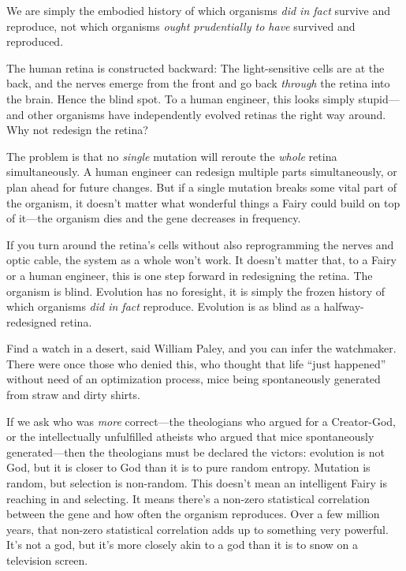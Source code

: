 {
 We are simply the embodied history of which organisms \textit{did
in fact} survive and reproduce, not which organisms \textit{ought
prudentially to have} survived and reproduced.}

{
 The human retina is constructed backward: The light-sensitive
cells are at the back, and the nerves emerge from the front and go back
\textit{through} the retina into the brain. Hence the blind spot. To a
human engineer, this looks simply stupid---and other organisms have
independently evolved retinas the right way around. Why not redesign
the retina?}

{
 The problem is that no \textit{single} mutation will reroute the
\textit{whole} retina simultaneously. A human engineer can redesign
multiple parts simultaneously, or plan ahead for future changes. But if
a single mutation breaks some vital part of the organism, it
doesn't matter what wonderful things a Fairy could
build on top of it---the organism dies and the gene decreases in
frequency.}

{
 If you turn around the retina's cells without also
reprogramming the nerves and optic cable, the system as a whole
won't work. It doesn't matter that, to
a Fairy or a human engineer, this is one step forward in redesigning
the retina. The organism is blind. Evolution has no foresight, it is
simply the frozen history of which organisms \textit{did in fact}
reproduce. Evolution is as blind as a halfway-redesigned retina.}

{
 Find a watch in a desert, said William Paley, and you can infer
the watchmaker. There were once those who denied this, who thought that
life ``just happened'' without need
of an optimization process, mice being spontaneously generated from
straw and dirty shirts.}

{
 If we ask who was \textit{more} correct---the theologians who
argued for a Creator-God, or the intellectually unfulfilled atheists
who argued that mice spontaneously generated---then the theologians
must be declared the victors: evolution is not God, but it is closer to
God than it is to pure random entropy. Mutation is random, but
selection is non-random. This doesn't mean an
intelligent Fairy is reaching in and selecting. It means
there's a non-zero statistical correlation between the
gene and how often the organism reproduces. Over a few million years,
that non-zero statistical correlation adds up to something very
powerful. It's not a god, but it's more
closely akin to a god than it is to snow on a television screen.}

